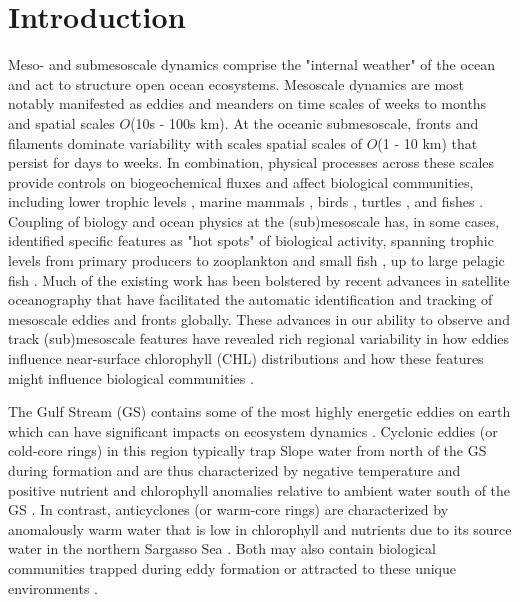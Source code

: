 \section{Introduction}

Meso- and submesoscale dynamics comprise the "internal weather" of the ocean \citep{McGillicuddy2001} and act to structure open ocean ecosystems. Mesoscale dynamics are most notably manifested as eddies and meanders on time scales of weeks to months and spatial scales $O$(10s - 100s km). At the oceanic submesoscale, fronts and filaments dominate variability with scales spatial scales of $O$(1 - 10 km) that persist for days to weeks. In combination, physical processes across these scales provide controls on biogeochemical fluxes \citep{McGillicuddy2016, Mahadevan2016} and affect biological communities, including lower trophic levels \citep{Abraham1998, Martin2003, Labat2009}, marine mammals \citep{Cotte2007, Polovina2006, Bailleul2010, Cotte2015}, birds \citep{Scales2014, TewKai2009}, turtles \citep{Gaube2017, Kobayashi2011, Scales2015}, and fishes \citep{Worm2005, Miller2015, Queiroz2016}. Coupling of biology and ocean physics at the (sub)mesoscale has, in some cases, identified specific features as "hot spots" of biological activity, spanning trophic levels from primary producers \citep{benitez2007mesoscale, Falkowski1991, McGillicuddy2007, Thompson2007} to zooplankton and small fish \citep{godo2012mesoscale}, up to large pelagic fish \citep{Hobday2014, Gaube2018, BraunSwords}. Much of the existing work has been bolstered by recent advances in satellite oceanography that have facilitated the automatic identification and tracking of mesoscale eddies \citep{Chelton2011} and fronts \citep{Belkin2009} globally. These advances in our ability to observe and track (sub)mesoscale features have revealed rich regional variability in how eddies influence near-surface chlorophyll (CHL) distributions \citep{Gaube2014, McGillicuddy2016} and how these features might influence biological communities \citep{Kobayashi2011, Gaube2017, Belkin2014, Queiroz2016, Gaube2018}.

The Gulf Stream (GS) contains some of the most highly energetic eddies on earth \citep{Chelton2011} which can have significant impacts on ecosystem dynamics \citep{Davis1985, Boyd1986, Gaube2018, Gaube2014, Gaube2017DSR}. Cyclonic eddies (or cold-core rings) in this region typically trap Slope water from north of the GS during formation and are thus characterized by negative temperature and positive nutrient and chlorophyll anomalies relative to ambient water south of the GS \citep{Gaube2017DSR, Pingree1979, RingGroup1981}. In contrast, anticyclones (or warm-core rings) are characterized by anomalously warm water that is low in chlorophyll and nutrients due to its source water in the northern Sargasso Sea \citep{Gaube2017DSR, Olson1986}. Both may also contain biological communities trapped during eddy formation \citep{Davis1985, WiebeFlierl1983} or attracted to these unique environments \citep{Hsu2015, Gaube2018}.

